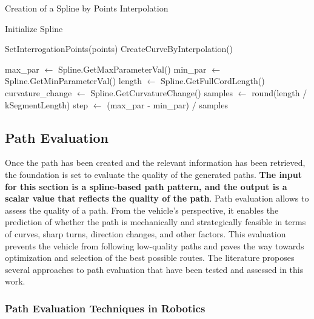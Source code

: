 \begin{algorithm}[H]
    \caption{Creation of a Spline by Points Interpolation}\label{alg:createSplines}

    \SetAlgoLined
    
    Initialize Spline\;
    
    SetInterrogationPoints(points)\;
    CreateCurveByInterpolation()\;
    
    max\_par $\gets$ Spline.GetMaxParameterVal()\;
    min\_par $\gets$ Spline.GetMinParameterVal()\;
    length $\gets$ Spline.GetFullCordLength()\;
    curvature\_change $\gets$ Spline.GetCurvatureChange()\;
    samples $\gets$ round(length / kSegmentLength)\;
    step $\gets$ (max\_par - min\_par) / samples\;
    
    
    \;
    
    \end{algorithm}




\subsection{Path Evaluation}
Once the path has been created and the relevant information has been retrieved, the foundation is set to evaluate the 
quality of the generated paths. \textbf{The input for this section is a spline-based path pattern, and the 
output is a scalar value that reflects the quality of the path}.
Path evaluation allows to assess the quality of a path. From the vehicle's perspective, it enables the 
prediction of whether the path is mechanically and strategically feasible in terms of curves, sharp turns, direction 
changes, and other factors. This evaluation prevents the vehicle from following low-quality paths and paves the way 
towards optimization and selection of the best possible routes.
The literature proposes several approaches to path evaluation 
that have been tested and assessed in this work.

\subsubsection{Path Evaluation Techniques in Robotics}
 
